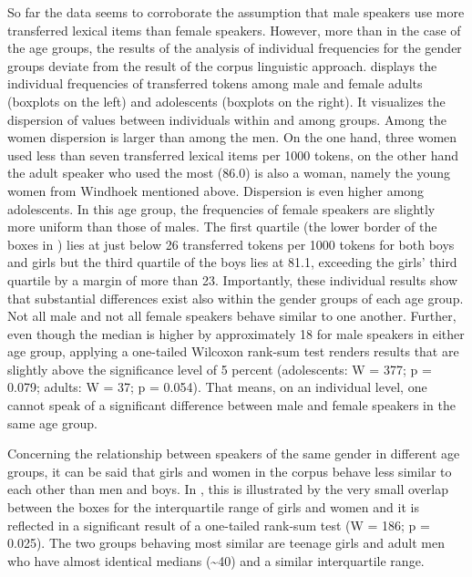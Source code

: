 \documentclass[output=paper]{langsci/langscibook}
\begin{document}
So far the data seems to corroborate the assumption that male speakers use more transferred lexical items than female speakers. However, more than in the case of the age groups, the results of the analysis of individual frequencies for the gender groups deviate from the result of the corpus linguistic approach.  displays the individual frequencies of transferred tokens among male and female adults (boxplots on the left) and adolescents (boxplots on the right). It visualizes the dispersion of values between individuals within and among groups. Among the women dispersion is larger than among the men. On the one hand, three women used less than seven transferred lexical items per 1000 tokens, on the other hand the adult speaker who used the most (86.0) is also a woman, namely the young women from Windhoek mentioned above. Dispersion is even higher among adolescents. In this age group, the frequencies of female speakers are slightly more uniform than those of males. The first quartile (the lower border of the boxes in ) lies at just below 26 transferred tokens per 1000 tokens for both boys and girls but the third quartile of the boys lies at 81.1, exceeding the girls’ third quartile by a margin of more than 23. Importantly, these individual results show that substantial differences exist also within the gender groups of each age group. Not all male and not all female speakers behave similar to one another. Further, even though the median is higher by approximately 18 for male speakers in either age group, applying a one-tailed Wilcoxon rank-sum test renders results that are slightly above the significance level of 5 percent (adolescents: W = 377; p = 0.079; adults: W = 37; p = 0.054). That means, on an individual level, one cannot speak of a significant difference between male and female speakers in the same age group.

Concerning the relationship between speakers of the same gender in different age groups, it can be said that girls and women in the corpus behave less similar to each other than men and boys. In , this is illustrated by the very small overlap between the boxes for the interquartile range of girls and women and it is reflected in a significant result of a one-tailed rank-sum test (W = 186; p = 0.025). The two groups behaving most similar are teenage girls and adult men who have almost identical medians ({\textasciitilde}40) and a similar interquartile range.
\end{document}
